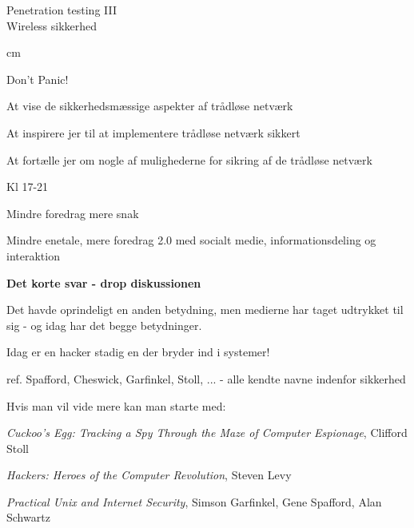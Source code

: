 \documentclass[20pt,landscape,a4paper,footrule]{foils}
\begin{document}

\mytitlepage
{Penetration testing III\\ Wireless sikkerhed}


\LogoOn



 cm

\centerline{\color{titlecolor}\LARGE Don't Panic!}

\begin{list1}
\item At vise de sikkerhedsmæssige aspekter af trådløse netværk

\item At inspirere jer til at implementere trådløse netværk sikkert

\item At fortælle jer om nogle af mulighederne for sikring af de
  trådløse netværk
\end{list1}



\begin{list1}
\item Kl 17-21
\item Mindre foredrag mere snak
\item Mindre enetale, mere foredrag 2.0 med socialt medie, informationsdeling og interaktion
\end{list1}


{\bfseries Det korte svar - drop diskussionen}

Det havde oprindeligt en anden betydning, men medierne har taget
udtrykket til sig - og idag har det begge betydninger.

{\color{red}\hlkbig Idag er en hacker stadig en der bryder ind i systemer!}

ref. Spafford, Cheswick, Garfinkel, Stoll, ...
- alle kendte navne indenfor sikkerhed

Hvis man vil vide mere kan man starte med:
\begin{list2}
\item \emph{Cuckoo's Egg: Tracking a Spy Through the Maze of Computer
 Espionage},  Clifford Stoll
\item \emph{Hackers: Heroes of the Computer Revolution},
Steven Levy
\item \emph{Practical Unix and Internet Security},
Simson Garfinkel, Gene Spafford, Alan Schwartz
\end{list2}
\end{document}
